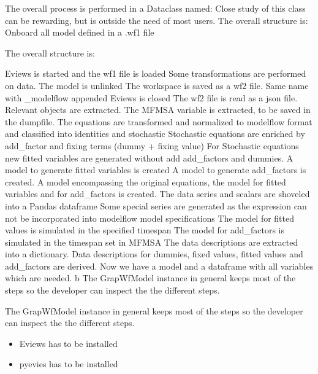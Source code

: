 \documentclass[letterpaper,10pt,english]{jupyterBook}
\begin{document}
\sphinxAtStartPar
The overall process is performed in a Dataclass named:
Close study of this class can be rewarding, but is outside the need of most users.
The overall structure is: Onboard all model defined in a .wf1 file

\sphinxAtStartPar
The overall structure is:

\sphinxAtStartPar
Eviews is started and the wf1 file is loaded
Some transformations are performed on data.
The model is unlinked
The workspace is saved as a wf2 file. Same name with \_modelflow appended
Eviews is closed
The wf2 file is read as a json file.
Relevant objects are extracted.
The MFMSA variable is extracted, to be saved in the dumpfile.
The equations are transformed and normalized to modelflow format and classified into identities and stochastic
Stochastic equations are enriched by add\_factor and fixing terms (dummy + fixing value)
For Stochastic equations new fitted variables are generated \sphinxhyphen{} without add add\_factors and dummies.
A model to generate fitted variables is created
A model to generate add\_factors is created.
A model encompassing the original equations, the model for fitted variables and for add\_factors is created.
The data series and scalars are shoveled into a Pandas dataframe
Some special series are generated as the expression can not be incorporated into modelflow model specifications
The model for fitted values is simulated in the specified timespan
The model for add\_factors is simulated in the timespan set in MFMSA
The data descriptions are extracted into a dictionary.
Data descriptions for dummies, fixed values, fitted values and add\_factors are derived.
Now we have a model and a dataframe with all variables which are needed. b The GrapWfModel instance in general keeps most of the steps so the developer can inspect the the different steps.

\sphinxAtStartPar
The GrapWfModel instance in general keeps most of the steps so the developer can inspect the the different steps.
\begin{itemize}
\item {} 
\sphinxAtStartPar
Eviews has to be installed

\item {} 
\sphinxAtStartPar
pyevies has to be installed

\end{itemize}
\end{document}
